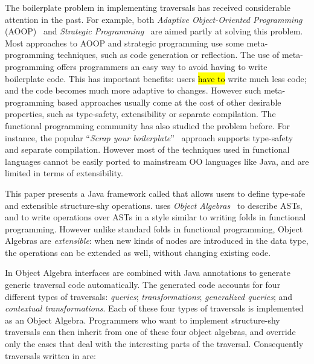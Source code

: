The boilerplate problem in implementing traversals has received
considerable attention in the past. For example, both \emph{Adaptive
  Object-Oriented Programming} (AOOP)~\cite{DemeterBook} and
\emph{Strategic Programming}~\cite{borovansky1996elan,visser1998core}
are aimed partly at solving this problem. Most approaches to AOOP and
strategic programming use some meta-programming techniques, such as
code generation or reflection. The use of meta-programming offers
programmers an easy way to avoid having to write boilerplate code.
This has important benefits: users \hl{have to} write much less code; and
the code becomes much more adaptive to changes.
However such meta-programming based approaches usually come at the cost of
other desirable properties, such as type-safety, extensibility or
separate compilation. The functional programming community has also
studied the problem before. For instance, the popular ``\emph{Scrap your
boilerplate}''~\cite{ralf03syb} approach supports type-safety and
separate compilation. However most of the techniques used in
functional languages cannot be easily ported to mainstream OO
languages like Java, and are limited in terms of extensibility.



This paper presents a Java framework called \name that allows users to
define type-safe and extensible structure-shy operations. \name
uses \emph{Object Algebras}~\cite{bruno12oa} to describe ASTs, and to
write operations over ASTs in a style similar to writing folds in
functional programming. However unlike standard folds in
functional programming, Object Algebras are
\emph{extensible}: when new kinds of nodes are introduced in the data type, the operations can be extended as well, without changing existing code.

In \name Object Algebra interfaces are combined
with Java annotations to generate generic traversal code automatically. The
generated code accounts for four different types of traversals:
\emph{queries}; \emph{transformations}; \emph{generalized queries};
and \emph{contextual transformations}.  Each of these four types of
traversals is implemented as an Object Algebra. Programmers who want
to implement structure-shy traversals can then inherit from one of these
four object algebras, and override only the cases that deal with
the interesting parts of the traversal. Consequently
traversals written in \name are:

